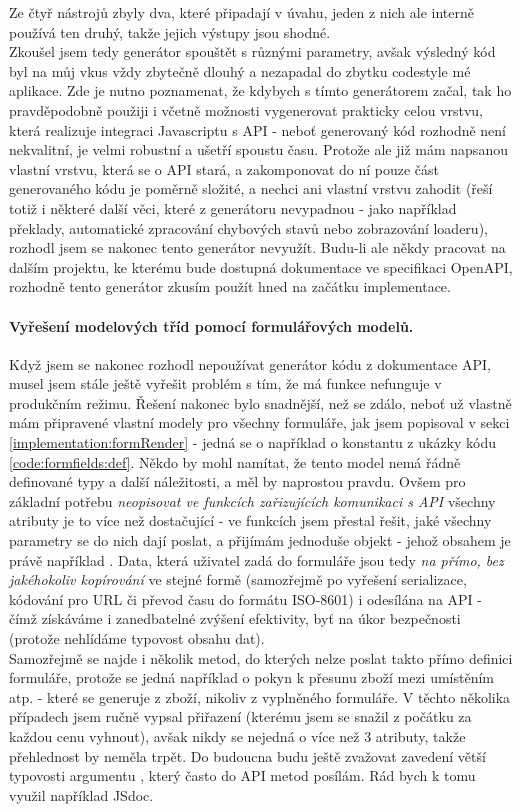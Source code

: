 Ze čtyř nástrojů zbyly dva, které připadají v úvahu, jeden z nich ale interně používá ten druhý, takže jejich výstupy jsou shodné.\\
Zkoušel jsem tedy generátor spouštět s různými parametry, avšak výsledný kód byl na můj vkus vždy zbytečně dlouhý a nezapadal do zbytku codestyle mé aplikace. Zde je nutno poznamenat, že kdybych s tímto generátorem začal, tak ho pravděpodobně použiji i včetně možnosti vygenerovat prakticky celou vrstvu, která realizuje integraci Javascriptu s API - neboť generovaný kód rozhodně není nekvalitní, je velmi robustní a ušetří spoustu času. Protože ale již mám napsanou vlastní vrstvu, která se o API stará, a zakomponovat do ní pouze část generovaného kódu je poměrně složité, a nechci ani vlastní vrstvu zahodit (řeší totiž i některé další věci, které z generátoru nevypadnou - jako například překlady, automatické zpracování chybových stavů nebo zobrazování loaderu), rozhodl jsem se nakonec tento generátor nevyužít. Budu-li ale někdy pracovat na dalším projektu, ke kterému bude dostupná dokumentace ve specifikaci OpenAPI, rozhodně tento generátor zkusím použít hned na začátku implementace.

\paragraph{Vyřešení modelových tříd pomocí formulářových modelů.} Když jsem se nakonec rozhodl nepoužívat generátor kódu z dokumentace API, musel jsem stále ještě vyřešit problém s tím, že má funkce  nefunguje v produkčním režimu. Řešení nakonec bylo snadnější, než se zdálo, neboť už vlastně mám připravené vlastní modely pro všechny formuláře, jak jsem popisoval v sekci \ref{implementation:formRender} - jedná se o například o konstantu  z ukázky kódu \ref{code:formfields:def}. Někdo by mohl namítat, že tento model nemá řádně definované typy a další náležitosti, a měl by naprostou pravdu. Ovšem pro základní potřebu \emph{neopisovat ve funkcích zařizujících komunikaci s API} všechny atributy je to více než dostačující - ve funkcích jsem přestal řešit, jaké všechny parametry se do nich dají poslat, a přijímám jednoduše objekt  - jehož obsahem je právě například . Data, která uživatel zadá do formuláře jsou tedy \emph{na přímo, bez jakéhokoliv kopírování} ve stejné formě (samozřejmě po vyřešení serializace, kódování pro URL či převod času do formátu ISO-8601) i odesílána na API - čímž získáváme i zanedbatelné zvýšení efektivity, byť na úkor bezpečnosti (protože nehlídáme typovost obsahu dat).\\
Samozřejmě se najde i několik metod, do kterých nelze poslat takto přímo definici formuláře, protože se jedná například o pokyn k přesunu zboží mezi umístěním atp. - které se generuje z  zboží, nikoliv z vyplněného formuláře. V těchto několika případech jsem ručně vypsal přiřazení (kterému jsem se snažil z počátku za každou cenu vyhnout), avšak nikdy se nejedná o více než 3 atributy, takže přehlednost by neměla trpět.
Do budoucna budu ještě zvažovat zavedení větší typovosti argumentu , který často do API metod posílám. Rád bych k tomu využil například JSdoc.

